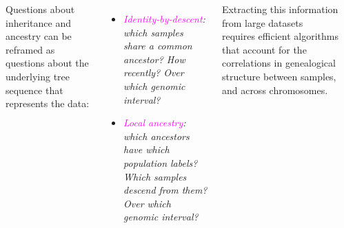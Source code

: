 \documentclass[25pt, a0paper, portrait, margin=0mm, innermargin=15mm,
     blockverticalspace=15mm, colspace=15mm, subcolspace=8mm]{tikzposter} %
\newcommand{\magenta}[1]{\textcolor{magenta}{#1}}
\begin{document}
\begin{columns}
{\begin{center}
\end{center}
{\fontsize{34}{35}\selectfont Questions about inheritance and ancestry can be reframed as questions about the underlying tree sequence that represents the data:
          \begin{itemize}
          \item {\it \magenta{Identity-by-descent}: which samples share a common ancestor? How recently? Over which genomic interval?}
          \item {\it \magenta{Local ancestry}: which ancestors have which population labels? Which samples descend from them? Over which genomic interval?}
          \end{itemize}
Extracting this information from large datasets requires efficient algorithms that account for the correlations in genealogical structure between samples, and across chromosomes.}
          }           
       
\vspace{20cm}

\end{columns}
\end{document}
